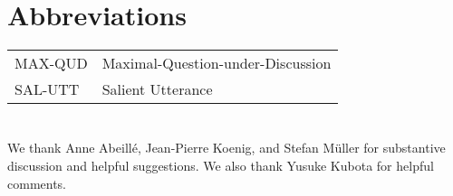 







\section*{Abbreviations}

\begin{tabularx}{.99\textwidth}{@{}lX}
MAX-QUD & Maximal-Question-under-Discussion\\
SAL-UTT & Salient Utterance\\
\end{tabularx}


\section*{\acknowledgmentsUS}

We thank Anne Abeill\'{e}, Jean-Pierre Koenig, and Stefan Müller
for substantive discussion and helpful suggestions. We also thank  
Yusuke Kubota for helpful comments.  

{\sloppy
\printbibliography[heading=subbibliography,notkeyword=this]
}
%





